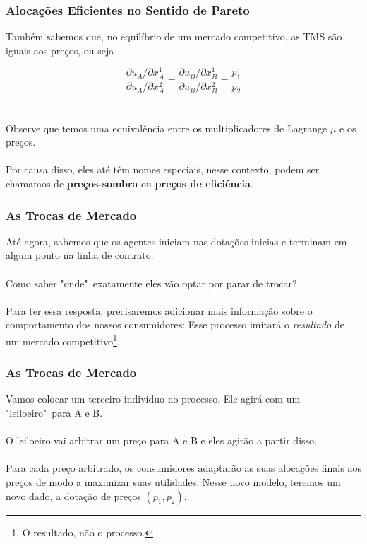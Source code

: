 \documentclass{beamer}[10]
\begin{document}
\begin{frame}
	\frametitle{Alocações Eficientes no Sentido de Pareto}

	Também sabemos que, no equilíbrio de um mercado competitivo, as TMS são iguais aos preços, ou seja

	$$	\frac{\partial u_A / \partial x_{A}^1 }{\partial u_A / \partial x_{A}^2} = \frac{\partial u_B / \partial x_{B}^1 }{\partial u_B / \partial x_{B}^2} = \frac{ p_{1} }{ p_{2} } $$
	\\~\\
	Observe que temos uma equivalência entre os multiplicadores de Lagrange $\mu$ e os preços. 
	\\~\\
	Por causa disso, eles até têm nomes especiais, nesse contexto, podem ser chamamos de \textbf{preços-sombra} ou \textbf{preços de eficiência}.

\end{frame}

\begin{frame}
	\frametitle{As Trocas de Mercado}

	Até agora, sabemos que os agentes iniciam nas dotações inicias e terminam em algum ponto na linha de contrato.
	\\~\\
	Como saber "onde"\ exatamente eles vão optar por parar de trocar?
	\\~\\
	Para ter essa resposta, precisaremos adicionar mais informação sobre o comportamento dos nossos consumidores: Esse processo imitará o \textit{resultado} de um mercado competitivo\footnote{O resultado, não o processo.}.

\end{frame}

\begin{frame}
	\frametitle{As Trocas de Mercado}

	Vamos colocar um terceiro indivíduo no processo. Ele agirá com um "leiloeiro"\ para A e B.
	\\~\\
	O leiloeiro vai arbitrar um preço para A e B e eles agirão a partir disso. 
	\\~\\
	Para cada preço arbitrado, os consumidores adaptarão as suas alocações finais aos preços de modo a maximizar suas utilidades. Nesse novo modelo, teremos  um novo dado, a dotação de preços $(p_1,p_2)$.

\end{frame}
\end{document}
